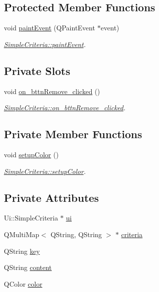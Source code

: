 \subsection*{Protected Member Functions}
\begin{DoxyCompactItemize}
\item 
void \hyperlink{class_simple_criteria_a40508f971a4801258861b113abd56985}{paint\+Event} (Q\+Paint\+Event $\ast$event)
\begin{DoxyCompactList}\small\item\em \hyperlink{class_simple_criteria_a40508f971a4801258861b113abd56985}{Simple\+Criteria\+::paint\+Event}. \end{DoxyCompactList}\end{DoxyCompactItemize}
\subsection*{Private Slots}
\begin{DoxyCompactItemize}
\item 
void \hyperlink{class_simple_criteria_a2f94a7c07b51bc96a7d6fad0177d1398}{on\+\_\+bttn\+Remove\+\_\+clicked} ()
\begin{DoxyCompactList}\small\item\em \hyperlink{class_simple_criteria_a2f94a7c07b51bc96a7d6fad0177d1398}{Simple\+Criteria\+::on\+\_\+bttn\+Remove\+\_\+clicked}. \end{DoxyCompactList}\end{DoxyCompactItemize}
\subsection*{Private Member Functions}
\begin{DoxyCompactItemize}
\item 
void \hyperlink{class_simple_criteria_a57ee6f50514f21b0c275b74d5a4d4b81}{setup\+Color} ()
\begin{DoxyCompactList}\small\item\em \hyperlink{class_simple_criteria_a57ee6f50514f21b0c275b74d5a4d4b81}{Simple\+Criteria\+::setup\+Color}. \end{DoxyCompactList}\end{DoxyCompactItemize}
\subsection*{Private Attributes}
\begin{DoxyCompactItemize}
\item 
Ui\+::\+Simple\+Criteria $\ast$ \hyperlink{class_simple_criteria_a0ab7c643ac34ad4c3bfc9a2e2bc24798}{ui}
\item 
Q\+Multi\+Map$<$ Q\+String, Q\+String $>$ $\ast$ \hyperlink{class_simple_criteria_a1faf01cc62a91685e2b7da2a07169708}{criteria}
\item 
Q\+String \hyperlink{class_simple_criteria_a1afc125b9086d8d56a065dd99a09876f}{key}
\item 
Q\+String \hyperlink{class_simple_criteria_a5cf96300cd20625404d845f6a4ef35a6}{content}
\item 
Q\+Color \hyperlink{class_simple_criteria_a667ee7796b15fbdc8ce75b3b4e29cf79}{color}
\end{DoxyCompactItemize}


